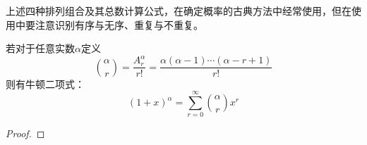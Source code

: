 上述四种排列组合及其总数计算公式，在确定概率的古典方法中经常使用，但在使用中要注意识别有序与无序、重复与不重复。

\begin{theorem}[牛顿二项式定理]\label{No}
  若对于任意实数$\alpha$定义
  \[ \binom{\alpha}{r}=\frac{A^{\alpha}_{r}}{r!}=\frac{\alpha(\alpha-1)\cdots (\alpha-r+1)}{r!} \]
  则有牛顿二项式：
  \[ (1+x)^{\alpha}=\sum_{r=0}^{\infty}\binom{\alpha}{r}x^r \]
\end{theorem}

\begin{proof}
\end{proof}